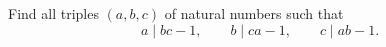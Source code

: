 Find all triples $(a,b,c)$ of natural numbers such that
$$a \mid bc-1, \qquad b \mid ca-1, \qquad c \mid ab-1.$$
